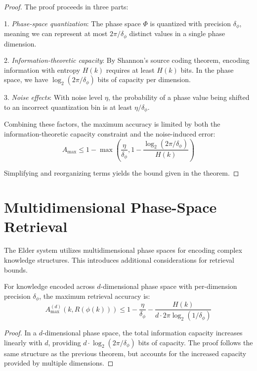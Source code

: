 \begin{proof}
The proof proceeds in three parts:

1. \textit{Phase-space quantization}: The phase space $\Phi$ is quantized with precision $\delta_\phi$, meaning we can represent at most $2\pi / \delta_\phi$ distinct values in a single phase dimension.

2. \textit{Information-theoretic capacity}: By Shannon's source coding theorem, encoding information with entropy $H(k)$ requires at least $H(k)$ bits. In the phase space, we have $\log_2(2\pi / \delta_\phi)$ bits of capacity per dimension.

3. \textit{Noise effects}: With noise level $\eta$, the probability of a phase value being shifted to an incorrect quantization bin is at least $\eta/\delta_\phi$.

Combining these factors, the maximum accuracy is limited by both the information-theoretic capacity constraint and the noise-induced error:
\begin{equation}
A_{\max} \leq 1 - \max\left(\frac{\eta}{\delta_\phi}, 1 - \frac{\log_2(2\pi / \delta_\phi)}{H(k)}\right)
\end{equation}

Simplifying and reorganizing terms yields the bound given in the theorem.
\end{proof}

\section{Multidimensional Phase-Space Retrieval}

The Elder system utilizes multidimensional phase spaces for encoding complex knowledge structures. This introduces additional considerations for retrieval bounds.

\begin{theorem}
For knowledge encoded across $d$-dimensional phase space with per-dimension precision $\delta_\phi$, the maximum retrieval accuracy is:
\begin{equation}
A_{\max}^{(d)}(k, R(\phi(k))) \leq 1 - \frac{\eta}{\delta_\phi} - \frac{H(k)}{d \cdot 2\pi \log_2(1/\delta_\phi)}
\end{equation}
\end{theorem}

\begin{proof}
In a $d$-dimensional phase space, the total information capacity increases linearly with $d$, providing $d \cdot \log_2(2\pi / \delta_\phi)$ bits of capacity. The proof follows the same structure as the previous theorem, but accounts for the increased capacity provided by multiple dimensions.
\end{proof}


